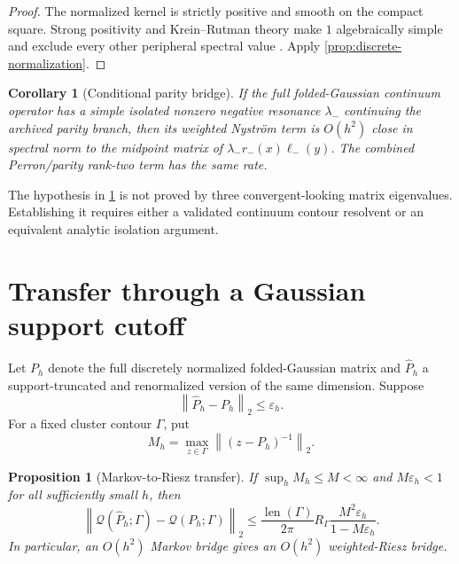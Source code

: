 \documentclass[11pt]{article}
\newtheorem{proposition}[theorem]{Proposition}
\newtheorem{corollary}[theorem]{Corollary}
\theoremstyle{definition}
\theoremstyle{remark}
\newcommand{\norm}[1]{\left\lVert #1\right\rVert}
\newcommand{\cQ}{\mathcal Q}
\newcommand{\len}{\operatorname{len}}
\begin{document}
\begin{proof}
The normalized kernel is strictly positive and smooth on the compact square.
Strong positivity and Krein--Rutman theory make $1$ algebraically simple and
exclude every other peripheral spectral value
\citep{Schaefer1974,WangContinuum2026}.  Apply
\cref{prop:discrete-normalization}.
\end{proof}

\begin{corollary}[Conditional parity bridge]
\label{cor:parity}
If the full folded-Gaussian continuum operator has a simple isolated nonzero
negative resonance $\lambda_-$ continuing the archived parity branch, then
its weighted Nystr\"om term is $O(h^2)$ close in spectral norm to the
midpoint matrix of $\lambda_-r_-(x)\ell_-(y)$.  The combined Perron/parity
rank-two term has the same rate.
\end{corollary}

The hypothesis in \cref{cor:parity} is not proved by three convergent-looking
matrix eigenvalues.  Establishing it requires either a validated continuum
contour resolvent or an equivalent analytic isolation argument.

\section{Transfer through a Gaussian support cutoff}
\label{sec:cutoff}

Let $P_h$ denote the full discretely normalized folded-Gaussian matrix and
$\widehat P_h$ a support-truncated and renormalized version of the same
dimension.  Suppose
\begin{equation}
 \norm{\widehat P_h-P_h}_2\le\varepsilon_h.
 \label{eq:markov-bridge}
\end{equation}
For a fixed cluster contour $\Gamma$, put
\[
 M_h=\max_{z\in\Gamma}\norm{(z-P_h)^{-1}}_2.
\]

\begin{proposition}[Markov-to-Riesz transfer]
\label{prop:cutoff-transfer}
If $\sup_hM_h\le M<\infty$ and $M\varepsilon_h<1$ for all sufficiently
small $h$, then
\begin{equation}
 \norm{\cQ(\widehat P_h;\Gamma)-\cQ(P_h;\Gamma)}_2
 \le
 \frac{\len(\Gamma)}{2\pi}R_\Gamma
 \frac{M^2\varepsilon_h}{1-M\varepsilon_h}.
 \label{eq:cutoff-riesz-bound}
\end{equation}
In particular, an $O(h^2)$ Markov bridge gives an $O(h^2)$ weighted-Riesz
bridge.
\end{proposition}
\end{document}
